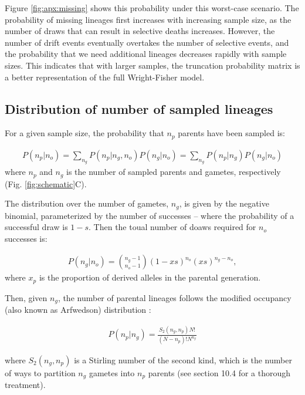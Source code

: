 \documentclass[review]{elsarticle}
\begin{document}
Figure \ref{fig:apx:missing} shows this probability under this worst-case scenario. The probability
of missing lineages first increases with increasing sample size, as the number of draws that can
result in selective deaths increases. However, the number of drift events eventually overtakes the
number of selective events, and the probability that we need additional lineages decreases rapidly
with sample sizes. This indicates that with larger samples, the truncation probability matrix is a
better representation of the full Wright-Fisher model.

\subsection{Distribution of number of sampled lineages}
\label{subsec:distribution}

For a given sample size, the probability that $n_p$ parents have been sampled is:

\begin{align}
  \label{eq:conditional}
  P(n_p | n_o) = \sum_{n_g} P(n_p | n_g,n_o)P(n_g | n_o) = \sum_{n_g} P(n_p | n_g)P(n_g | n_o) 
\end{align}
where $n_p$ and $n_g$ is the number of sampled parents and gametes, respectively (Fig.
\ref{fig:schematic}C). 

The distribution over the number of gametes, $n_g$, is given by the negative binomial,
parameterized by the number of successes -- where the probability of a successful draw is $1-s$.
Then the toual number of doaws required for $n_o$ successes is:

\begin{align}
  \label{eq:neg-binomial-trials}
  P(n_g|n_o) = \binom{n_g-1}{n_o-1}(1-xs)^{n_o}(xs)^{n_g-n_o},
\end{align}
where $x_p$ is the proportion of derived alleles in the parental generation.

Then, given $n_g$, the number of parental lineages follows the modified occupancy (also known as
Arfwedson) distribution \citep{Wakeley2009,ONeill2019,JohnsonEtAl2005}:

\begin{align}
  \label{eq:occupancy}
  P(n_p|n_g) = \frac{S_2(n_g,n_p) N!}{(N-n_p)! N^{n_g}}
\end{align}

where $S_2(n_g,n_p)$ is a Stirling number of the second kind, which is the number of ways to
partition $n_g$ gametes into $n_p$ parents (see \cite{JohnsonEtAl2005} section 10.4 for a thorough
treatment).
\end{document}
